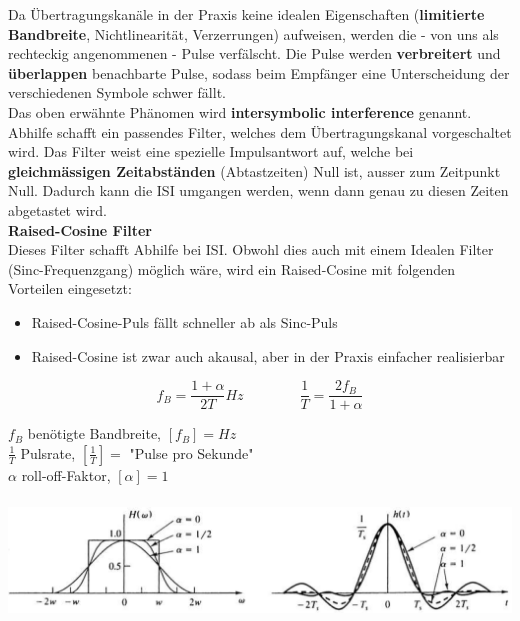 Da Übertragungskanäle in der Praxis keine idealen Eigenschaften 
(\textbf{limitierte Bandbreite}, Nichtlinearität, Verzerrungen) aufweisen,
werden die - von uns als rechteckig
angenommenen - Pulse verfälscht. Die Pulse werden \textbf{verbreitert} und \textbf{überlappen}
benachbarte Pulse, sodass beim Empfänger eine Unterscheidung der verschiedenen Symbole schwer
fällt. \\
Das oben erwähnte Phänomen wird \textbf{intersymbolic interference} genannt. \\
Abhilfe schafft ein passendes Filter, welches dem Übertragungskanal vorgeschaltet wird. Das Filter
weist eine spezielle Impulsantwort auf, welche bei \textbf{gleichmässigen Zeitabständen}
(Abtastzeiten) Null ist, ausser zum Zeitpunkt Null. Dadurch kann die ISI umgangen werden, wenn dann
genau zu diesen Zeiten abgetastet wird. \\ 

\textbf{Raised-Cosine Filter } \\
Dieses Filter schafft Abhilfe bei ISI. Obwohl dies auch mit einem Idealen Filter
(Sinc-Frequenzgang) möglich wäre, wird ein Raised-Cosine mit folgenden Vorteilen eingesetzt:
\begin{itemize}
  \item Raised-Cosine-Puls fällt schneller ab als Sinc-Puls
  \item Raised-Cosine ist zwar auch akausal, aber in der Praxis einfacher realisierbar 
\end{itemize}

\begin{minipage}{9cm}
$$ f_B = \frac{1 + \alpha}{2 T} Hz \qquad \qquad \frac{1}{T} = \frac{2 f_B}{1 + \alpha}$$
\end{minipage}
\begin{minipage}{9cm}
	$f_B$ benötigte Bandbreite, $[f_B] = Hz$ \\
	$\frac{1}{T}$ Pulsrate, $[\frac{1}{T}] = $ "Pulse pro Sekunde" \\
	$\alpha$ roll-off-Faktor, $[\alpha] = 1$ 
\end{minipage}

\begin{center}  
		\includegraphics[height=3.2cm]{bilder/dig_raisedcosinefilter.png}
\end{center}


